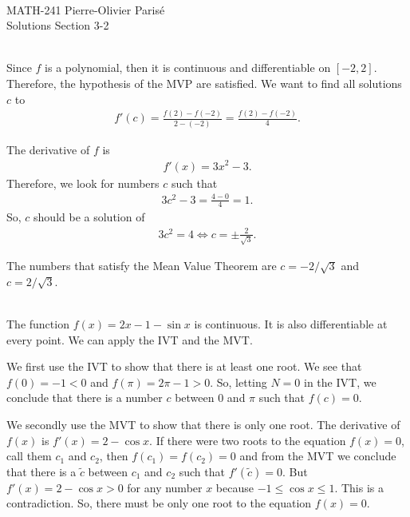 


	\noindent \hrulefill \\
	MATH-241 \hfill Pierre-Olivier Paris{\'e}\\
	Solutions Section 3-2 \hfill \semester \\\vspace*{-1cm}
	
	\noindent\hrulefill
	
	\spc
		
	\\
	Since $f$ is a polynomial, then it is continuous and differentiable on $[-2, 2]$. Therefore, the hypothesis of the MVP are satisfied. We want to find all solutions $c$ to
		\begin{align*}
		f' (c) = \frac{f (2) - f(-2)}{2 - (-2)} = \frac{f(2) - f(-2)}{4} .
		\end{align*}
	
	The derivative of $f$ is 
		\begin{align*}
		f'(x) = 3x^2 - 3 .
		\end{align*}
	Therefore, we look for numbers $c$ such that
		\begin{align*}
		3c^2 - 3 = \frac{4 - 0}{4} = 1 .
		\end{align*}
	So, $c$ should be a solution of
		\begin{align*}
		3c^2 = 4 \iff c = \pm \frac{2}{\sqrt{3}} .
		\end{align*}
	
	The numbers that satisfy the Mean Value Theorem are $c = -2/\sqrt{3}$ and $c = 2/\sqrt{3}$. 
	
	\spc
	
	\\
	The function $f (x) = 2x - 1 - \sin x$ is continuous. It is also differentiable at every point. We can apply the IVT and the MVT.
	
	We first use the IVT to show that there is at least one root. We see that $f(0) = -1 < 0$ and $f(\pi ) = 2\pi - 1 > 0$. So, letting $N = 0$ in the IVT, we conclude that there is a number $c$ between $0$ and $\pi$ such that $f(c) = 0$. 
	
	We secondly use the MVT to show that there is only one root. The derivative of $f(x)$ is $f'(x) = 2 - \cos x$. If there were two roots to the equation $f(x) = 0$, call them $c_1$ and $c_2$, then $f(c_1) = f(c_2) = 0$ and from the MVT we conclude that there is a $\tilde{c}$ between $c_1$ and $c_2$ such that $f'(\tilde{c}) = 0$. But $f'(x) = 2 - \cos x > 0$ for any number $x$ because $-1 \leq \cos x \leq 1$. This is a contradiction. So, there must be only one root to the equation $f(x) = 0$.
	
